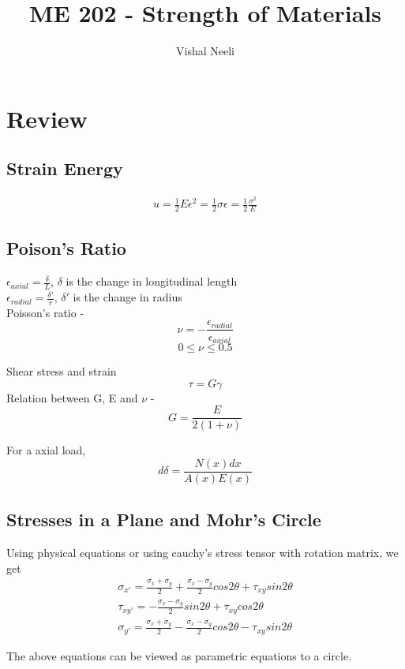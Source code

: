 \documentclass{article}
\title{ME 202 - Strength of Materials}
\author{Vishal Neeli}
\date{}
\begin{document}
\maketitle

\section{Review}
	\subsection{Strain Energy}
	\begin{align*}
		u = \frac{1}{2} E \epsilon^2 = \frac{1}{2} \sigma \epsilon = \frac{1}{2} \frac{\sigma^2}{E}
	\end{align*}

	\subsection{Poison's Ratio}

	$\epsilon_{axial}= \frac{\delta}{L}$, $\delta$ is the change in longitudinal length\\
	$\epsilon_{radial}= \frac{\delta'}{r}$, $\delta'$ is the change in radius\\

	Poisson's ratio -
	\[\nu = -\frac{\epsilon_{radial}}{\epsilon_{axial}}\]
	\[0\leq \nu \leq 0.5\]

	Shear stress and strain
	\[\tau = G \gamma\]
	Relation between G, E and $\nu$ - 
	\[G= \frac{E}{2(1+\nu)}\]

	For a axial load, 
	\[d\delta = \frac{N(x) dx}{A(x) E(x)}\]


	\subsection{Stresses in a Plane and Mohr's Circle}
	Using physical equations or using cauchy's stress tensor with rotation matrix, we get
	\begin{gather}
		\sigma_{x'} = \frac{\sigma_x + \sigma_y}{2} + \frac{\sigma_x - \sigma_y}{2} cos2\theta + \tau_{xy} sin2\theta \\
		\tau_{xy'} = -\frac{\sigma_x - \sigma_y}{2} sin2\theta + \tau_{xy} cos2\theta \\
		\sigma_{y'} = \frac{\sigma_x + \sigma_y}{2} - \frac{\sigma_x - \sigma_y}{2} cos2\theta - \tau_{xy} sin2\theta
	\end{gather}

	The above equations can be viewed as parametric equations to a circle.
\end{document}
